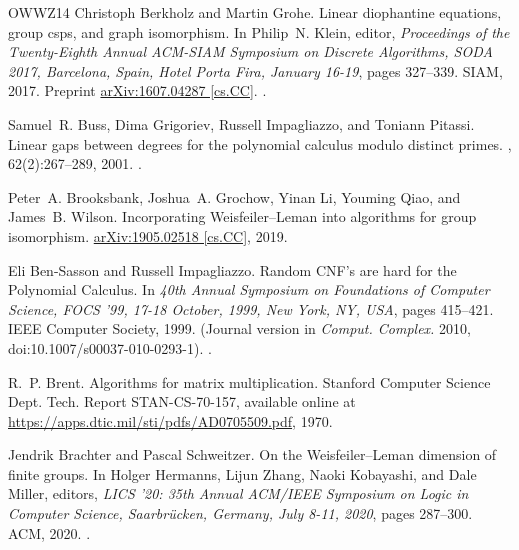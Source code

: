 \documentclass[10pt,a4paper]{article}
\theoremstyle{definition}
\begin{document}
\begin{thebibliography}{OWWZ14}
Christoph Berkholz and Martin Grohe.
\newblock Linear diophantine equations, group csps, and graph isomorphism.
\newblock In Philip~N. Klein, editor, {\em Proceedings of the Twenty-Eighth
  Annual {ACM-SIAM} Symposium on Discrete Algorithms, {SODA} 2017, Barcelona,
  Spain, Hotel Porta Fira, January 16-19}, pages 327--339. {SIAM}, 2017.
\newblock Preprint \href{http://arxiv.org/abs/1607.04287}{arXiv:1607.04287
  [cs.CC]}.
\newblock \href {https://doi.org/10.1137/1.9781611974782.21}
  {}.

Samuel~R. Buss, Dima Grigoriev, Russell Impagliazzo, and Toniann Pitassi.
\newblock Linear gaps between degrees for the polynomial calculus modulo
  distinct primes.
, 62(2):267--289, 2001.
\newblock \href {https://doi.org/10.1006/jcss.2000.1726}
  {}.

Peter~A. Brooksbank, Joshua~A. Grochow, Yinan Li, Youming Qiao, and James~B.
  Wilson.
\newblock Incorporating {Weisfeiler}--{Leman} into algorithms for group
  isomorphism.
\newblock \href{https://arxiv.org/abs/1905.02518}{arXiv:1905.02518 [cs.CC]},
  2019.

Eli Ben{-}Sasson and Russell Impagliazzo.
\newblock Random {CNF}'s are hard for the {Polynomial} {Calculus}.
\newblock In {\em 40th Annual Symposium on Foundations of Computer Science,
  {FOCS} '99, 17-18 October, 1999, New York, NY, {USA}}, pages 415--421. {IEEE}
  Computer Society, 1999.
\newblock (Journal version in \emph{Comput. Complex.} 2010,
  doi:10.1007/s00037-010-0293-1).
\newblock \href {https://doi.org/10.1109/SFFCS.1999.814613}
  {}.

R.~P. Brent.
\newblock Algorithms for matrix multiplication.
\newblock Stanford Computer Science Dept. Tech. Report STAN-CS-70-157,
  available online at
  \href{https://apps.dtic.mil/sti/pdfs/AD0705509.pdf}{https://apps.dtic.mil/sti/pdfs/AD0705509.pdf},
  1970.

Jendrik Brachter and Pascal Schweitzer.
\newblock On the {Weisfeiler}--{Leman} dimension of finite groups.
\newblock In Holger Hermanns, Lijun Zhang, Naoki Kobayashi, and Dale Miller,
  editors, {\em {LICS} '20: 35th Annual {ACM/IEEE} Symposium on Logic in
  Computer Science, Saarbr{\"{u}}cken, Germany, July 8-11, 2020}, pages
  287--300. {ACM}, 2020.
\newblock \href {https://doi.org/10.1145/3373718.3394786}
  {}.


\end{thebibliography}
\end{document}
